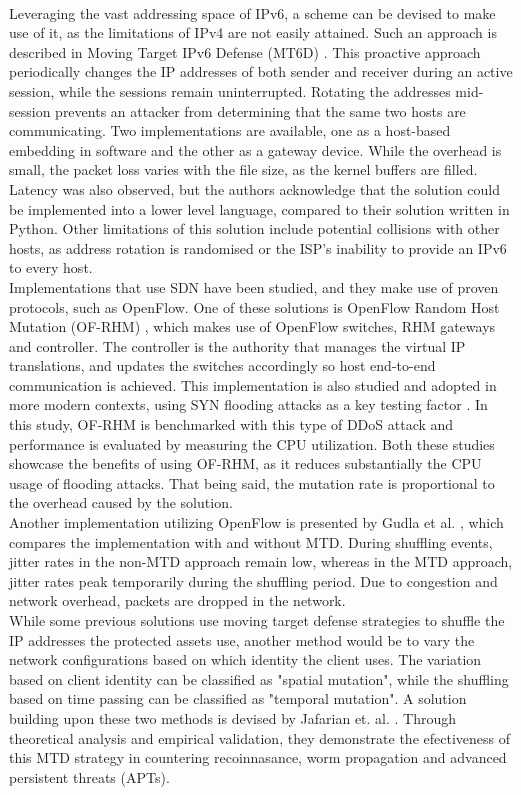 \documentclass[conference]{IEEEtran}
\begin{document}
\\
Leveraging the vast addressing space of IPv6, a scheme can be devised to make use of it, as the limitations of IPv4 are not easily attained. Such an approach is described in Moving Target IPv6 Defense (MT6D) \cite{dunlop2011}. This proactive approach periodically changes the IP addresses of both sender and receiver during an active session, while the sessions remain uninterrupted. Rotating the addresses mid-session prevents an attacker from determining that the same two hosts are communicating. Two implementations are available, one as a host-based embedding in software and the other as a gateway device. While the overhead is small, the packet loss varies with the file size, as the kernel buffers are filled. Latency was also observed, but the authors acknowledge that the solution could be implemented into a lower level language, compared to their solution written in Python. Other limitations of this solution include potential  collisions with other hosts, as address rotation is randomised or the ISP's inability to provide an IPv6 to every host.
\\
Implementations that use SDN have been studied, and they make use of proven protocols, such as OpenFlow. One of these solutions is OpenFlow Random Host Mutation (OF-RHM) \cite{jafarian2012}, which makes use of OpenFlow switches, RHM gateways and controller. The controller is the authority that manages the virtual IP translations, and updates the switches accordingly so host end-to-end communication is achieved. This implementation is also studied and adopted in more modern contexts, using SYN flooding attacks as a key testing factor \cite{rochak2023}. In this study, OF-RHM is benchmarked with this type of DDoS attack and performance is evaluated by measuring the CPU utilization. Both these studies showcase the benefits of using OF-RHM, as it reduces substantially the CPU usage of flooding attacks. That being said, the mutation rate is proportional to the overhead caused by the solution.
\\
Another implementation utilizing OpenFlow is presented by Gudla et al. \cite{gudla2016}, which compares the implementation with and without MTD. During shuffling events, jitter rates in the non-MTD approach remain low, whereas in the MTD approach, jitter rates peak temporarily during the shuffling period. Due to congestion and network overhead, packets are dropped in the network.
\\
While some previous solutions use moving target defense strategies to shuffle the IP addresses the protected assets use, another method would be to vary the network configurations based on which identity the client uses. The variation based on client identity can be classified as "spatial mutation", while the shuffling based on time passing can be classified as "temporal mutation". A solution building upon these two methods is  devised by Jafarian et. al. \cite{jafarian2014}. Through theoretical analysis and empirical validation, they demonstrate the efectiveness of this MTD strategy in countering recoinnasance, worm propagation and advanced persistent threats (APTs).
\end{document}
